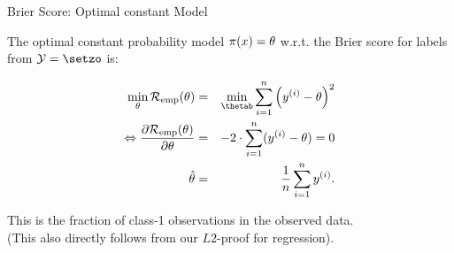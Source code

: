 \begin{vbframe}{Brier Score: Optimal constant Model}

The optimal constant probability model $\pi(x) = \theta$ w.r.t. the Brier score for labels from $\Yspace = \setzo$ is:

\begin{eqnarray*}
  \min_{\theta} \riske(\theta) &=& \min_{\thetab} \sumin \left(\yi - \theta\right)^2 \\
  \Leftrightarrow \frac{\partial \riske(\theta)}{\partial \theta} &=& - 2 \cdot \sumin (\yi - \theta) = 0 \\
  \hat \theta &=& \frac{1}{n} \sumin \yi.   
\end{eqnarray*}

This is the fraction of class-1 observations in the observed data.\\
(This also directly follows from our $L2$-proof for regression).

\end{vbframe}

